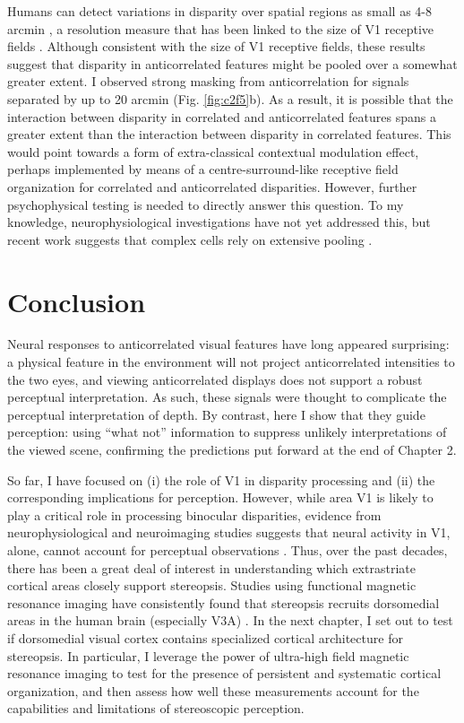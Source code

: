 Humans can detect variations in disparity over spatial regions as small as 4-8 arcmin \cite{Harris:1997kx,Banks:2004oh}, a resolution measure that has been linked to the size of V1 receptive fields \cite{Nienborg:2004ra}. Although consistent with the size of V1 receptive fields, these results suggest that disparity in anticorrelated features might be pooled over a somewhat greater extent. I observed strong masking from anticorrelation for signals separated by up to 20 arcmin (Fig. \ref{fig:c2f5}b). As a result, it is possible that the interaction between disparity in correlated and anticorrelated features spans a greater extent than the interaction between disparity in correlated features. This would point towards a form of extra-classical contextual modulation effect, perhaps implemented by means of a centre-surround-like receptive field organization for correlated and anticorrelated disparities. However, further psychophysical testing is needed to directly answer this question. To my knowledge, neurophysiological investigations have not yet addressed this, but recent work suggests that complex cells rely on extensive pooling \cite{Sasaki:2010pi,Kato:2016fk}.

\section{Conclusion}

Neural responses to anticorrelated visual features have long appeared surprising: a physical feature in the environment will not project anticorrelated intensities to the two eyes, and viewing anticorrelated displays does not support a robust perceptual interpretation. As such, these signals were thought to complicate the perceptual interpretation of depth. By contrast, here I show that they guide perception: using ``what not'' information to suppress unlikely interpretations of the viewed scene, confirming the predictions put forward at the end of Chapter 2. 

So far, I have focused on (i) the role of V1 in disparity processing and (ii) the corresponding implications for perception. However, while area V1 is likely to play a critical role in processing binocular disparities, evidence from neurophysiological and neuroimaging studies suggests that neural activity in V1, alone, cannot account for perceptual observations \cite{Cumming:1999zr,Preston:2008dg,Nienborg:2014fu}. Thus, over the past decades, there has been a great deal of interest in understanding which extrastriate cortical areas closely support stereopsis. Studies using functional magnetic resonance imaging have consistently found that stereopsis recruits dorsomedial areas in the human brain (especially V3A) \cite{Backus:2001ly,Tsao:2003lk,Preston:2008dg}. In the next chapter, I set out to test if dorsomedial visual cortex contains specialized cortical architecture for stereopsis. In particular, I leverage the power of ultra-high field magnetic resonance imaging to test for the presence of persistent and systematic cortical organization, and then assess how well these measurements account for the capabilities and limitations of stereoscopic perception.



